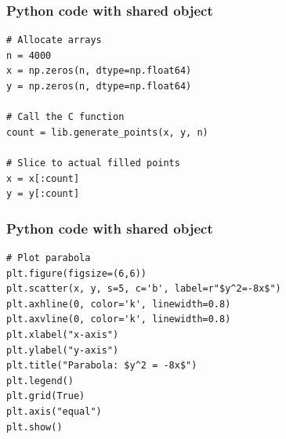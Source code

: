 \documentclass{beamer}
\begin{document}
\begin{frame}[fragile]
\frametitle{Python code with shared object}
\begin{lstlisting}
# Allocate arrays
n = 4000
x = np.zeros(n, dtype=np.float64)
y = np.zeros(n, dtype=np.float64)

# Call the C function
count = lib.generate_points(x, y, n)

# Slice to actual filled points
x = x[:count]
y = y[:count]

\end{lstlisting}
\end{frame}
\begin{frame}[fragile]
\frametitle{Python code with shared object}
\begin{lstlisting}
# Plot parabola
plt.figure(figsize=(6,6))
plt.scatter(x, y, s=5, c='b', label=r"$y^2=-8x$")
plt.axhline(0, color='k', linewidth=0.8)
plt.axvline(0, color='k', linewidth=0.8)
plt.xlabel("x-axis")
plt.ylabel("y-axis")
plt.title("Parabola: $y^2 = -8x$")
plt.legend()
plt.grid(True)
plt.axis("equal")
plt.show()

\end{lstlisting}
\end{frame}
\end{document}
